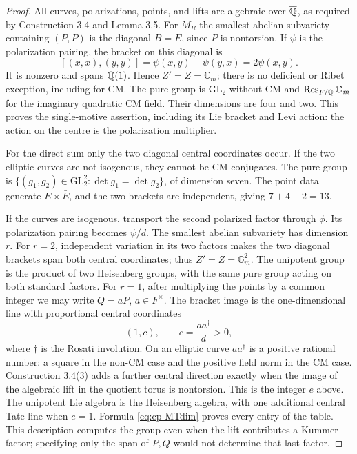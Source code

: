 \begin{proof}
All curves, polarizations, points, and lifts are algebraic over
$\overline{\mathbb Q}$, as required by Construction 3.4 and Lemma 3.5.
For $M_R$ the smallest abelian subvariety containing $(P,P)$ is
the diagonal $B=E$, since $P$ is nontorsion. If $\psi$ is the
polarization pairing, the bracket on this diagonal is
\[
 [(x,x),(y,y)]=\psi(x,y)-\psi(y,x)=2\psi(x,y).
\]
It is nonzero and spans $\mathbb Q(1)$. Hence $Z'=Z=\mathbb G_m$;
there is no deficient or Ribet exception, including for CM.
The pure group is $\mathrm{GL}_2$ without CM and
$\operatorname{Res}_{F/\mathbb Q}\mathbb G_m$ for the imaginary
quadratic CM field. Their dimensions are four and two.
This proves the single-motive assertion, including its Lie
bracket and Levi action: the action on the centre is the
polarization multiplier.

For the direct sum only the two diagonal central coordinates
occur. If the two elliptic curves are not isogenous, they
cannot be CM conjugates. The pure group is
$\{(g_1,g_2)\in\mathrm{GL}_2^2:\det g_1=\det g_2\}$,
of dimension seven. The point data generate $E\times\bar E$,
and the two brackets are independent, giving $7+4+2=13$.

If the curves are isogenous, transport the second polarized
factor through $\phi$. Its polarization pairing becomes
$\psi/d$. The smallest abelian subvariety has dimension $r$.
For $r=2$, independent variation in its two factors makes the
two diagonal brackets span both central coordinates; thus
$Z'=Z=\mathbb G_m^2$. The unipotent group is the product
of two Heisenberg groups, with the same pure group acting
on both standard factors.
For $r=1$, after multiplying the points by a common integer
we may write $Q=aP$, $a\in F^\times$. The bracket image is
the one-dimensional line with proportional central coordinates
\begin{equation}\label{eq:cp-positive-centre}
 (1,c),\qquad c=\frac{a a^\dagger}{d}>0,
\end{equation}
where $\dagger$ is the Rosati involution. On an elliptic curve
$aa^\dagger$ is a positive rational number: a square in the
non-CM case and the positive field norm in the CM case.
Construction 3.4(3) adds a further central direction exactly
when the image of the algebraic lift in the quotient torus
is nontorsion. This is the integer $e$ above.
The unipotent Lie algebra is the Heisenberg algebra, with one
additional central Tate line when $e=1$. Formula
\eqref{eq:cp-MTdim} proves every entry of the table. This
description computes the group even when the lift contributes
a Kummer factor; specifying only the span of $P,Q$ would
not determine that last factor.
\end{proof}

